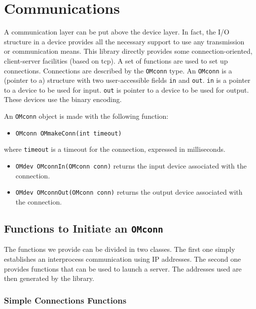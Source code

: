 \documentclass{article}
\begin{document}
\section{Communications}

A communication layer can be put above the device layer. 
In fact, the I/O structure in a device provides all the necessary support to
use any transmission or communication means.
This library directly provides some connection-oriented, client-server
facilities (based on {\sc tcp}). 
A set of functions are used to set up connections. Connections are described
by the {\tt OMconn} type. An {\tt OMconn} is a (pointer to a) structure with
two user-accessible fields {\tt in} and {\tt out}. {\tt in} is a pointer to a
device to be used for input. {\tt out} is pointer to a device to be used for
output. These devices use the binary encoding.

An {\tt OMconn} object is made with the following function:
\begin{itemize} 
\item \verb+OMconn OMmakeConn(int timeout)+
\end{itemize} 
where {\tt timeout} is a timeout for the connection, expressed in
milliseconds. 

\begin{itemize} 
\item \verb+OMdev OMconnIn(OMconn conn)+ returns the input device
associated with the connection.
\item \verb+OMdev OMconnOut(OMconn conn)+ returns the output device
associated with the connection.
\end{itemize} 

\subsection{Functions to Initiate an {\tt OMconn}}

The functions we provide can be divided in two classes. The first one
simply establishes an interprocess communication using {\sc IP} addresses.
The second one provides functions that can be used to launch a server. 
The addresses used are then generated by the library.


\subsubsection{Simple Connections Functions}
\end{document}
